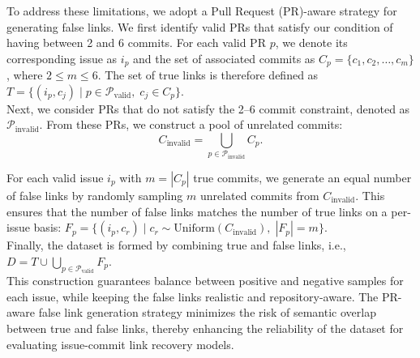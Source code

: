 



To address these limitations, we adopt a Pull Request (PR)-aware strategy for generating false links. We first identify valid PRs that satisfy our condition of having between 2 and 6 commits. For each valid PR $p$, we denote its corresponding issue as $i_p$ and the set of associated commits as $C_p = \{c_1, c_2, \dots, c_m\}$, where $2 \leq m \leq 6$. The set of true links is therefore defined as $T = \{(i_p, c_j) \mid p \in \mathcal{P}_{\text{valid}},\; c_j \in C_p\}$.\\

Next, we consider PRs that do not satisfy the 2--6 commit constraint, denoted as $\mathcal{P}_{\text{invalid}}$. From these PRs, we construct a pool of unrelated commits:
\[
C_{\text{invalid}} = \bigcup_{p \in \mathcal{P}_{\text{invalid}}} C_p.
\]

For each valid issue $i_p$ with $m = |C_p|$ true commits, we generate an equal number of false links by randomly sampling $m$ unrelated commits from $C_{\text{invalid}}$. This ensures that the number of false links matches the number of true links on a per-issue basis: $F_p = \{(i_p, c_r) \mid c_r \sim \text{Uniform}(C_{\text{invalid}}), \; |F_p| = m \}$.\\

\noindent
Finally, the dataset is formed by combining true and false links, i.e., $D = T \cup \bigcup_{p \in \mathcal{P}_{\text{valid}}} F_p$.\\

\noindent
This construction guarantees balance between positive and negative samples for each issue, while keeping the false links realistic and repository-aware. The PR-aware false link generation strategy minimizes the risk of semantic overlap between true and false links, thereby enhancing the reliability of the dataset for evaluating issue-commit link recovery models.


